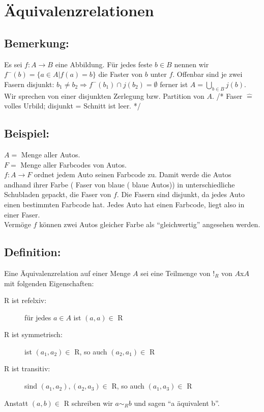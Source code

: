 \section{Äquivalenzrelationen}

\subsection{Bemerkung:}
	Es sei $f: A \rightarrow B$ eine Abbildung. Für jedes feste $b \in B$ nennen wir $f^{-}(b) = \{ a \in A | f(a) = b\}$ die Faster von $b$ unter $f$. Offenbar sind je zwei Fasern disjunkt: $b_{1} \neq b_{2} \Longrightarrow f^{-} (b_{1}) \cap j(b_{2}) = \emptyset$ ferner ist $ A =  	\mathop{\bigcup}\limits_{b \in B} j(b)$. Wir sprechen von einer disjunkten Zerlegung bzw. Partition von $A$. /*  Faser $\mathrel{\widehat{=}}$ volles Urbild; disjunkt = Schnitt ist leer. */ 

\subsection{Beispiel:}
	$ A =$ Menge aller Autos. \\
	$ F =$ Menge aller Farbcodes von Autos.\\
	$f: A \rightarrow F$ ordnet jedem Auto seinen Farbcode zu. Damit werde die Autos andhand ihrer Farbe ( Faser von blaue ( blaue Autos)) in unterschiedliche Schubladen gepackt, die Faser von $f$. Die Fasern sind disjunkt, da jedes Auto einen bestimmten Farbcode hat. Jedes Auto hat einen Farbcode, liegt also in einer Faser. \\
Vermöge $f$ können zwei Autos gleicher Farbe als "`gleichwertig"' angesehen werden. 

\subsection{Definition:}
Eine Äquivalenzrelation auf einer Menge $A$ sei eine Teilmenge von $!_{R}$ von $A$x$A$ mit folgenden Eigenschaften:
\begin{description}

	\item[R ist refelxiv:] für jedes $a \in A$ ist $(a,a) \in $ R
	\item[R ist symmetrisch:] ist $(a_{1}, a_{2}) \in $ R, so auch $(a_{2},a_{1}) \in$ R
	\item[R ist transitiv:] sind $(a_{1}, a_{2}),(a_{2}, a_{3}) \in$ R, so auch $(a_{1},a_{3}) \in$ R

\end{description}
Anstatt $(a,b) \in$ R schreiben wir $a \sim_{R} b$ und sagen "`a äquivalent b"'.


